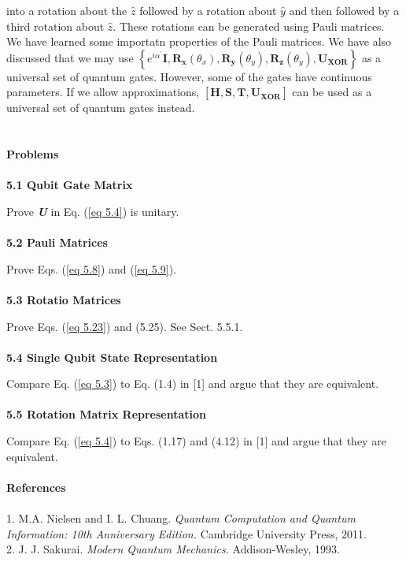 \documentclass{article}
\newcommand{\bfit}[1]{\textit{\textbf{#1}}}
\begin{document}
into a rotation about the $\hat{z}$ followed by a rotation about $\hat{y}$ and 
then followed by a third rotation about $\hat{z}$. These rotations can be 
generated using Pauli matrices. We have learned some importatn properties of the 
Pauli matrices. We have also discussed that we may use $\left\{e^{i\alpha^\prime}\boldsymbol{I}, \boldsymbol{R_x}(\theta_x), \boldsymbol{R_y}(\theta_y), \boldsymbol{R_z}(\theta_y), \boldsymbol{U}_{\boldsymbol{X O R}}\right\}$
as a universal set of quantum gates. However, some of the gates have continuous parameters. If we allow approximations, 
$\left[\boldsymbol{H, S, T}, \boldsymbol{U}_{\boldsymbol{X O R}}\right]$ can be used as a
universal set of quantum gates instead.\\\\\\
\textbf{\large Problems}\\\\
\textbf{ 5.1 Qubit Gate Matrix}

Prove \bfit{U} in Eq. (\ref{eq 5.4}) is unitary.\\\\
\textbf{ 5.2 Pauli Matrices}

Prove Eqs. (\ref{eq 5.8}) and (\ref{eq 5.9}).\\\\
\textbf{5.3 Rotatio Matrices}

Prove Eqs. (\ref{eq 5.23}) and (5.25). See Sect. 5.5.1.\\\\
\textbf{5.4 Single Qubit State Representation}

Compare Eq. (\ref{eq 5.3}) to Eq. (1.4) in [1] and argue that they are equivalent.\\\\
\textbf{5.5 Rotation Matrix Representation}

Compare Eq. (\ref{eq 5.4}) to Eqs. (1.17) and (4.12) in [1] and argue that they are equivalent.\\\\
\textbf{\large References}\\\\
1. M.A. Nielsen and I. L. Chuang. \textit{Quantum Computation and Quantum Information: 10th Anniversary Edition.} Cambridge University Press, 2011.\\
2. J. J. Sakurai. \textit{Modern Quantum Mechanics.} Addison-Wesley, 1993.
\end{document}
